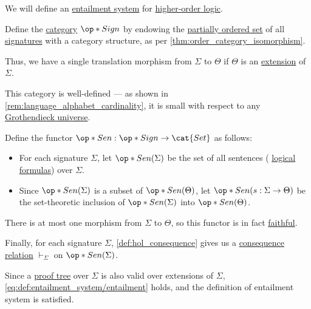 \begin{definition}\label{def:hol_entailment_system}\mimprovised
  We will define an \hyperref[def:entailment_system]{entailment system} for \hyperref[def:higher_order_logic]{higher-order logic}.

  \begin{thmenum}
     Define the \hyperref[def:category]{category} \( \op*{Sign} \) by endowing the \hyperref[def:partially_ordered_set]{partially ordered set} of all \hyperref[def:hol_signature]{signatures} with a category structure, as per \cref{thm:order_category_isomorphism}.

    Thus, we have a single translation morphism from \( \Sigma \) to \( \Theta \) if \( \Theta \) is an \hyperref[def:hol_signature_extension]{extension} of \( \Sigma \).

    This category is well-defined --- as shown in \cref{rem:language_alphabet_cardinality}, it is small with respect to any \hyperref[def:grothendieck_universe]{Grothendieck universe}.

     Define the functor \( \op*{Sen}: \op*{Sign} \to \cat{Set} \) as follows:
    \begin{itemize}
      \item For each signature \( \Sigma \), let \( \op*{Sen}(\Sigma) \) be the set of all sentences (\hyperref[def:hol_closed_expression]{} \hyperref[def:hol_expression/formula]{logical formulas}) over \( \Sigma \).

      \item Since \( \op*{Sen}(\Sigma) \) is a subset of \( \op*{Sen}(\Theta) \), let \( \op*{Sen}(s: \Sigma \to \Theta) \) be the set-theoretic inclusion of \( \op*{Sen}(\Sigma) \) into \( \op*{Sen}(\Theta) \).
    \end{itemize}

    There is at most one morphism from \( \Sigma \) to \( \Theta \), so this functor is in fact \hyperref[def:functor_invertibility/faithful]{faithful}.

     Finally, for each signature \( \Sigma \), \cref{def:hol_consequence} gives us a \hyperref[def:consequence_relation]{consequence relation} \( {\vdash_\Sigma} \) on \( \op*{Sen}(\Sigma) \).

    Since a \hyperref[def:hol_natural_deduction_proof_tree]{proof tree} over \( \Sigma \) is also valid over extensions of \( \Sigma \), \eqref{eq:def:entailment_system/entailment} holds, and the definition of entailment system is satisfied.
  \end{thmenum}
\end{definition}

